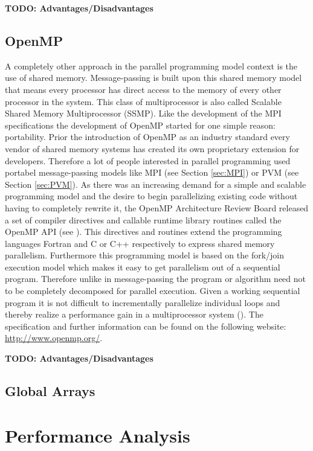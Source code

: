 \textbf{TODO: Advantages/Disadvantages}


\subsection{OpenMP}
\label{sec:OpenMP}

A completely other approach in the parallel programming model context
is the use of shared memory. Message-passing is built upon this shared
memory model that means every processor has direct access to the
memory of every other processor in the system. This class of
multiprocessor is also called Scalable Shared Memory Multiprocessor
(SSMP). Like the development of the MPI specifications the development
of OpenMP started for one simple reason: portability. Prior the
introduction of OpenMP as an industry standard every vendor of shared
memory systems has created its own proprietary extension for
developers. Therefore a lot of people interested in parallel
programming used portabel message-passing models like MPI (see
Section \ref{sec:MPI}) or PVM (see Section \ref{sec:PVM}). As there
was an increasing demand for a simple and scalable programming model and
the desire to begin parallelizing existing code without having to
completely rewrite it, the OpenMP Architecture Review Board released a
set of compiler directives and callable runtime library routines
called the OpenMP API (see \cite{openMP05}). This directives and routines extend the
programming languages Fortran and C or C++ respectively to express
shared memory parallelism.
Furthermore this programming model is based on the fork/join execution
model which makes it easy to get parallelism out of a sequential
program. Therefore unlike in message-passing the program or algorithm
need not to be completely decomposed for parallel execution. Given a
working sequential program it is not difficult to incrementally
parallelize individual loops and thereby realize a performance gain in
a multiprocessor system (\cite{dagum1997opi}). The specification and
further information can be found on the following website:
\url{http://www.openmp.org/}.

\textbf{TODO: Advantages/Disadvantages}

\subsection{Global Arrays}
\label{globalArrays}


\section{Performance Analysis}
\label{sec:perf_analysis}

